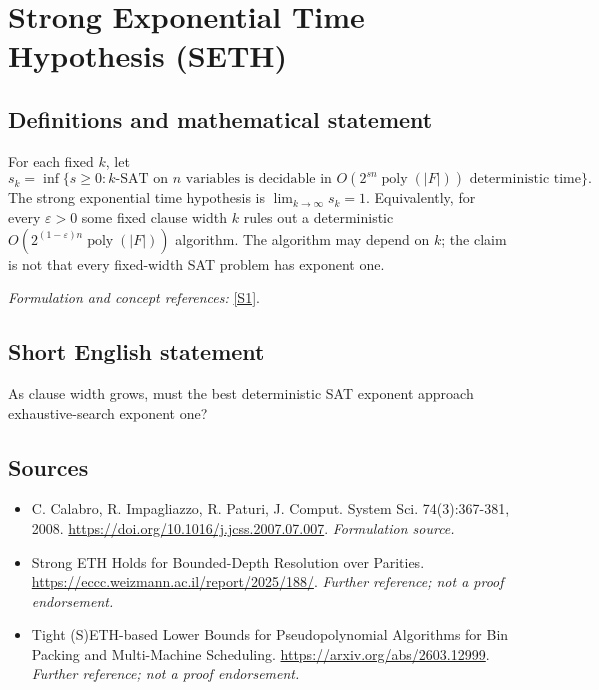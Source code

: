 \documentclass[11pt]{article}
\begin{document}
\section*{\texorpdfstring{Strong Exponential Time Hypothesis (SETH)}{Strong Exponential Time Hypothesis (SETH)}}\label{65}
\subsection{Definitions and mathematical statement}
For each fixed $k$, let
\[
 s_k=\inf\{s\ge0:k\text{-SAT on }n\text{ variables is decidable in }
 O(2^{sn}\operatorname{poly}(|F|))\text{ deterministic time}\}.
\]
The strong exponential time hypothesis is $\lim_{k\to\infty}s_k=1$. Equivalently, for every $\varepsilon>0$ some fixed clause width $k$ rules out a deterministic $O(2^{(1-\varepsilon)n}\operatorname{poly}(|F|))$ algorithm. The algorithm may depend on $k$; the claim is not that every fixed-width SAT problem has exponent one.
\par\smallskip\textit{Formulation and concept references:} \href{https://doi.org/10.1016/j.jcss.2007.07.007}{[S1]}.

\subsection{Short English statement}
As clause width grows, must the best deterministic SAT exponent approach exhaustive-search exponent one?
\subsection{Sources}
\begin{itemize}
\item[S1]C. Calabro, R. Impagliazzo, R. Paturi, J. Comput. System Sci. 74(3):367-381, 2008.
\url{https://doi.org/10.1016/j.jcss.2007.07.007}.
\textit{Formulation source.}
\item[S2]Strong ETH Holds for Bounded-Depth Resolution over Parities.
\url{https://eccc.weizmann.ac.il/report/2025/188/}.
\textit{Further reference; not a proof endorsement.}
\item[S3]Tight (S)ETH-based Lower Bounds for Pseudopolynomial Algorithms for Bin Packing and Multi-Machine Scheduling.
\url{https://arxiv.org/abs/2603.12999}.
\textit{Further reference; not a proof endorsement.}
\end{itemize}
\end{document}
